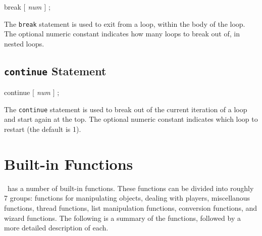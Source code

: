 \begin{code}
break {\em $[$ num $]$ } ;
\end{code}

The {\tt break} statement is used to exit from a loop, within the body of
the loop.  The optional numeric constant indicates how many loops
to break out of, in nested loops.

\subsection{{\tt continue} Statement}

\begin{code}
continue {\em $[$ num $]$ } ;
\end{code}

The {\tt continue} statement is used to break out of the current iteration
of a loop and start again at the top.  The optional numeric constant
indicates which loop to restart (the default is 1).

\section{Built-in Functions}

\COOLMUD\ has a number of built-in functions.  These functions can be
divided into roughly 7 groups:  functions for manipulating objects,
dealing with players, miscellanous functions, thread functions, list
manipulation functions, conversion functions, and wizard functions. 
The following is a summary of the functions, followed by a more
detailed description of each.


